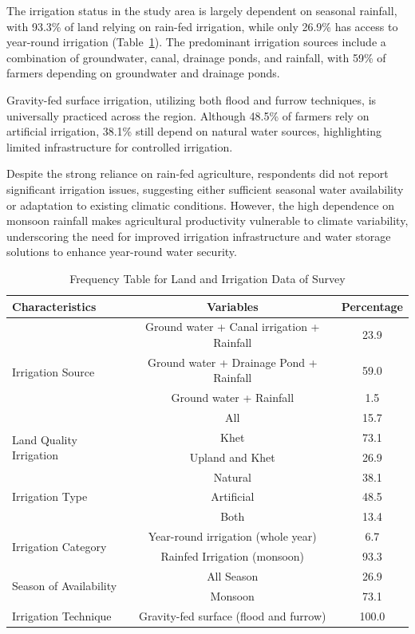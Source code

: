 The irrigation status in the study area is largely dependent on seasonal rainfall, with 93.3\% of land relying on rain-fed irrigation, while only 26.9\% has access to year-round irrigation (Table~\ref{tab:irrigation_data}). The predominant irrigation sources include a combination of groundwater, canal, drainage ponds, and rainfall, with 59\% of farmers depending on groundwater and drainage ponds. 

Gravity-fed surface irrigation, utilizing both flood and furrow techniques, is universally practiced across the region. Although 48.5\% of farmers rely on artificial irrigation, 38.1\% still depend on natural water sources, highlighting limited infrastructure for controlled irrigation. 

Despite the strong reliance on rain-fed agriculture, respondents did not report significant irrigation issues, suggesting either sufficient seasonal water availability or adaptation to existing climatic conditions. However, the high dependence on monsoon rainfall makes agricultural productivity vulnerable to climate variability, underscoring the need for improved irrigation infrastructure and water storage solutions to enhance year-round water security.




\begin{table}[htbp]
    \centering
    \caption{Frequency Table for Land and Irrigation Data of Survey}
    \label{tab:irrigation_data}
    \begin{tabular}{@{}lcc@{}}
        \toprule
        \textbf{Characteristics} & \textbf{Variables} & \textbf{Percentage} \\
        \midrule
        \multirow{4}{*}{Irrigation Source} & Ground water + Canal irrigation + Rainfall & 23.9 \\
        & Ground water + Drainage Pond + Rainfall & 59.0 \\
        & Ground water + Rainfall & 1.5 \\
        & All & 15.7 \\
        \midrule
        \multirow{2}{*}{Land Quality Irrigation} & Khet & 73.1 \\
        & Upland and Khet & 26.9 \\
        \midrule
        \multirow{3}{*}{Irrigation Type} & Natural & 38.1 \\
        & Artificial & 48.5 \\
        & Both & 13.4 \\
        \midrule
        \multirow{2}{*}{Irrigation Category} & Year-round irrigation (whole year) & 6.7 \\
        & Rainfed Irrigation (monsoon) & 93.3 \\
        \midrule
        \multirow{2}{*}{Season of Availability} & All Season & 26.9 \\
        & Monsoon & 73.1 \\
        \midrule
        Irrigation Technique & Gravity-fed surface (flood and furrow) & 100.0 \\
        \bottomrule
    \end{tabular}
\end{table}

